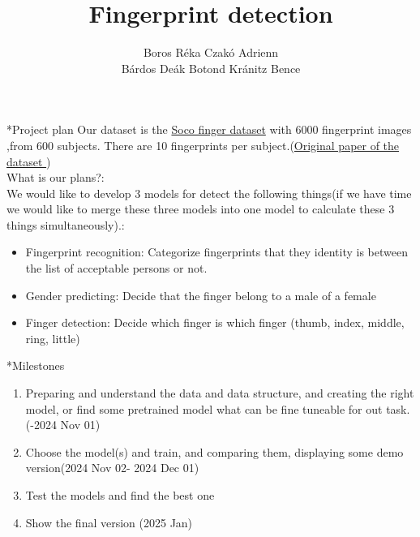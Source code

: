 \documentclass[]{scrartcl}
\title{Fingerprint detection}
\author{Boros Réka \quad 	Czakó Adrienn 	\\Bárdos Deák Botond \quad	Kránitz Bence}
\begin{document}
	\maketitle
\begin{section}*{Project plan}
	Our dataset is the  \href{https://www.kaggle.com/datasets/ruizgara/socofing}{Soco finger dataset} with 6000 fingerprint images ,from 600 subjects. There are 10 fingerprints per subject.(\href{https://arxiv.org/pdf/1807.10609}{Original paper of the dataset })
	\\What is our plans?:\\We would like to develop 3 models for detect the following things(if we have time we would like to merge these three models into one model to calculate these 3 things simultaneously).:
	\begin{itemize}
		\item Fingerprint recognition: Categorize fingerprints that they identity is between the list of acceptable persons or not.
		\item Gender predicting: Decide that the finger belong to a male of a female
		\item Finger detection: Decide which finger is which finger (thumb, index, middle, ring, little)
	\end{itemize}
\end{section}

\begin{section}*{Milestones}
	\begin{enumerate}
		\item Preparing and understand the data and data structure, and creating the right model, or find some pretrained model what can be fine tuneable for out task. \quad(-2024 Nov 01)
		\item Choose the model(s) and train, and comparing them, displaying some demo version\quad (2024 Nov 02- 2024 Dec 01)
		\item Test the models and find the best one
		\item Show the final version (2025 Jan)
	\end{enumerate}
	
\end{section}
\end{document}
